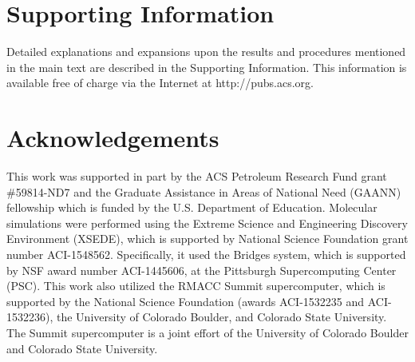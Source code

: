 \documentclass{article}
\begin{document}
  \section*{Supporting Information}

  Detailed explanations and expansions upon the results and procedures mentioned in
  the main text are described in the Supporting Information. This information is
  available free of charge via the Internet at http://pubs.acs.org.

  \section*{Acknowledgements}

  This work was supported in part by the ACS Petroleum Research Fund
  grant \#59814-ND7 and the Graduate Assistance in Areas of National Need (GAANN) 
  fellowship which is funded by the U.S. Department of Education. 
  Molecular simulations were performed using the Extreme Science and
  Engineering Discovery Environment (XSEDE), which is supported by National
  Science Foundation grant number ACI-1548562. Specifically, it used the Bridges
  system, which is supported by NSF award number ACI-1445606, at the Pittsburgh
  Supercomputing Center (PSC). This work also utilized the RMACC Summit supercomputer,
  which is supported by the National Science Foundation (awards ACI-1532235 and
  ACI-1532236), the University of Colorado Boulder, and Colorado State
  University. The Summit supercomputer is a joint effort of the University of
  Colorado Boulder and Colorado State University.

  \clearpage

  
  


\end{document}
